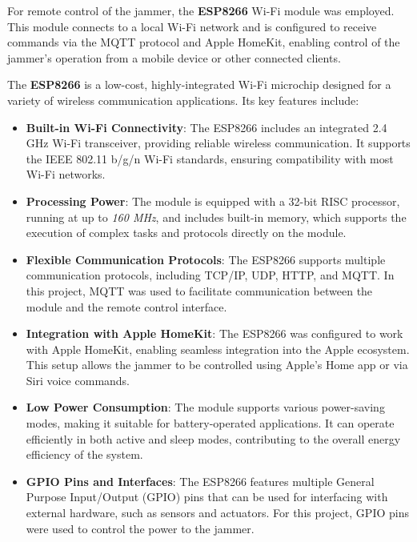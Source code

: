 For remote control of the jammer, the \textbf{ESP8266} \cite{ESP8266} Wi-Fi module was employed. This module connects to a local Wi-Fi network and is configured to receive commands via the MQTT protocol and Apple HomeKit, enabling control of the jammer's operation from a mobile device or other connected clients.

The \textbf{ESP8266} is a low-cost, highly-integrated Wi-Fi microchip designed for a variety of wireless communication applications. Its key features include:

\begin{itemize}
    \item \textbf{Built-in Wi-Fi Connectivity}: The ESP8266 includes an integrated 2.4 GHz Wi-Fi transceiver, providing reliable wireless communication. It supports the IEEE 802.11 b/g/n Wi-Fi standards, ensuring compatibility with most Wi-Fi networks.
    
    \item \textbf{Processing Power}: The module is equipped with a 32-bit RISC processor, running at up to \textit{160 MHz}, and includes built-in memory, which supports the execution of complex tasks and protocols directly on the module.
    
    \item \textbf{Flexible Communication Protocols}: The ESP8266 supports multiple communication protocols, including TCP/IP, UDP, HTTP, and MQTT. In this project, MQTT was used to facilitate communication between the module and the remote control interface.
    
    \item \textbf{Integration with Apple HomeKit}: The ESP8266 was configured to work with Apple HomeKit, enabling seamless integration into the Apple ecosystem. This setup allows the jammer to be controlled using Apple's Home app or via Siri voice commands.
    
    \item \textbf{Low Power Consumption}: The module supports various power-saving modes, making it suitable for battery-operated applications. It can operate efficiently in both active and sleep modes, contributing to the overall energy efficiency of the system.
    
    \item \textbf{GPIO Pins and Interfaces}: The ESP8266 features multiple General Purpose Input/Output (GPIO) pins that can be used for interfacing with external hardware, such as sensors and actuators. For this project, GPIO pins were used to control the power to the jammer.
\end{itemize}

